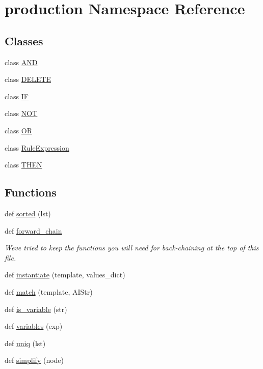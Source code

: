 \hypertarget{namespaceproduction}{}\section{production Namespace Reference}
\label{namespaceproduction}
\subsection*{Classes}
\begin{DoxyCompactItemize}
\item 
class \hyperlink{classproduction_1_1_a_n_d}{A\+N\+D}
\item 
class \hyperlink{classproduction_1_1_d_e_l_e_t_e}{D\+E\+L\+E\+T\+E}
\item 
class \hyperlink{classproduction_1_1_i_f}{I\+F}
\item 
class \hyperlink{classproduction_1_1_n_o_t}{N\+O\+T}
\item 
class \hyperlink{classproduction_1_1_o_r}{O\+R}
\item 
class \hyperlink{classproduction_1_1_rule_expression}{Rule\+Expression}
\item 
class \hyperlink{classproduction_1_1_t_h_e_n}{T\+H\+E\+N}
\end{DoxyCompactItemize}
\subsection*{Functions}
\begin{DoxyCompactItemize}
\item 
def \hyperlink{namespaceproduction_a7ac92e37cfa2c93a658d6ff66237a0fd}{sorted} (lst)
\item 
def \hyperlink{namespaceproduction_af279b12f495c76be9424cb6cf0fa014f}{forward\+\_\+chain}
\begin{DoxyCompactList}\small\item\em We\textquotesingle{}ve tried to keep the functions you will need for back-\/chaining at the top of this file. \end{DoxyCompactList}\item 
def \hyperlink{namespaceproduction_a010fe1af862244071801e839df05b6f2}{instantiate} (template, values\+\_\+dict)
\item 
def \hyperlink{namespaceproduction_a9ba3934c56c12a0922452b8d33555f4a}{match} (template, A\+I\+Str)
\item 
def \hyperlink{namespaceproduction_ac1aec33c79d4b61b1d7d0cdd3caa8faf}{is\+\_\+variable} (str)
\item 
def \hyperlink{namespaceproduction_a28e0a912c828dc4c508c279cadbb0514}{variables} (exp)
\item 
def \hyperlink{namespaceproduction_aaa6f4f50810b5cf264bd619fe117ecd1}{uniq} (lst)
\item 
def \hyperlink{namespaceproduction_a9cdd2d9b32a63904d61e06f5a0e3932e}{simplify} (node)
\end{DoxyCompactItemize}
